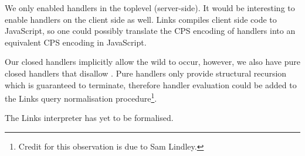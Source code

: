 We only enabled handlers in the toplevel (server-side). It would be interesting to enable handlers on the client side as well. Links compiles client side code to JavaScript, so one could possibly translate the CPS encoding of handlers into an equivalent CPS encoding in JavaScript.

Our closed handlers implicitly allow the wild to occur, however, we also have pure closed handlers that disallow . Pure handlers only provide structural recursion which is guaranteed to terminate, therefore handler evaluation could be added to the Links query normalisation procedure\footnote{Credit for this observation is due to Sam Lindley.}.

The Links interpreter has yet to be formalised.